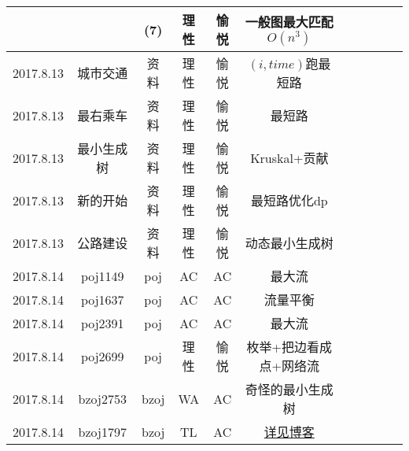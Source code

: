 \documentclass[landscape]{article}
\begin{document}
\begin{longtable}{ccccccccccc}
  & & (7) & 理性 & 愉悦 & 一般图最大匹配$O(n^3)$\\
  \hline
  2017.8.13 & 城市交通 & 资料 & 理性 & 愉悦 & $(i,time)$跑最短路\\
  \hline
  2017.8.13 & 最右乘车 & 资料 & 理性 & 愉悦 & 最短路\\
  \hline
  2017.8.13 & 最小生成树 & 资料 & 理性 & 愉悦 & Kruskal+贡献\\
  \hline
  2017.8.13 & 新的开始 & 资料 & 理性 & 愉悦 & 最短路优化dp\\
  \hline
  2017.8.13 & 公路建设 & 资料 & 理性 & 愉悦 & 动态最小生成树\\
  \hline
  2017.8.14 & poj1149 & poj & AC & AC & 最大流\\
  \hline
  2017.8.14 & poj1637 & poj & AC & AC & 流量平衡\\
  \hline
  2017.8.14 & poj2391 & poj & AC & AC & 最大流\\
  \hline
  2017.8.14 & poj2699 & poj & 理性 & 愉悦 & 枚举+把边看成点+网络流\\
  \hline
  2017.8.14 & bzoj2753 & bzoj & WA & AC & 奇怪的最小生成树\\
  \hline
  2017.8.14 & bzoj1797 & bzoj & TL & AC & \href{http://blog.csdn.net/xy20130630}{详见博客}\\
  \hline
\end{longtable}
\end{document}
